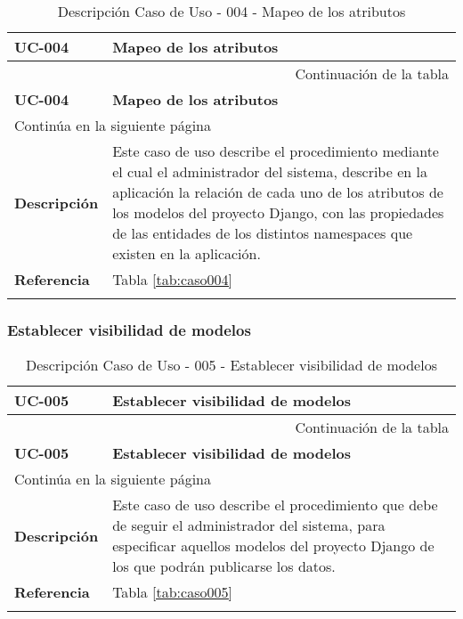 \begin{center}
\begin{longtable}{||p{3.4cm}|p{12cm}||}
 \hline \hline \bf UC-004 &  \bf Mapeo de los atributos \\
\hline
\endfirsthead
\hline \multicolumn{2}{|r|}{{Continuación de la tabla}} \\ \hline
 \hline \bf UC-004 &  \bf Mapeo de los atributos \\
\hline
\endhead
\hline \multicolumn{2}{|l|}{{Continúa en la siguiente página}} \\ \hline
\endfoot
\endlastfoot
 \hline \bf Descripción & Este caso de uso describe el procedimiento mediante
             el cual el administrador del sistema, describe en la aplicación la
             relación de cada uno de los atributos de los modelos del proyecto
             Django, con las propiedades de las entidades de los distintos
             namespaces que existen en la aplicación.\\
 \hline \bf Referencia & Tabla \ref{tab:caso004}\\
\hline
\hline
\caption{\label{tab:caso004-red} Descripción Caso de Uso - 004 - Mapeo de los atributos} 
\end{longtable}
\end{center}


\subsubsection{Establecer visibilidad de modelos}

\begin{center}
\begin{longtable}{||p{3.4cm}|p{12cm}||}
 \hline \hline \bf UC-005 &  \bf Establecer visibilidad de modelos \\
\hline
\endfirsthead
\hline \multicolumn{2}{|r|}{{Continuación de la tabla}} \\ \hline
 \hline \bf UC-005 &  \bf Establecer visibilidad de modelos \\
\hline
\endhead
\hline \multicolumn{2}{|l|}{{Continúa en la siguiente página}} \\ \hline
\endfoot
\endlastfoot
 \hline \bf Descripción & Este caso de uso describe el procedimiento que debe
             de seguir el administrador del sistema, para especificar aquellos
             modelos del proyecto Django de los que podrán publicarse los datos.\\
 \hline \bf Referencia & Tabla \ref{tab:caso005}\\
\hline
\hline
\caption{\label{tab:caso005-red} Descripción Caso de Uso - 005 - Establecer visibilidad de modelos} 
\end{longtable}
\end{center}


